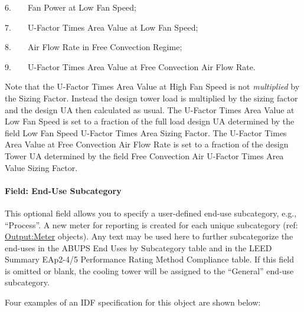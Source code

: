 6.~~~~Fan Power at Low Fan Speed;

7.~~~~U-Factor Times Area Value at Low Fan Speed;

8.~~~~Air Flow Rate in Free Convection Regime;

9.~~~~U-Factor Times Area Value at Free Convection Air Flow Rate.

Note that the U-Factor Times Area Value at High Fan Speed is not \emph{multiplied} by the Sizing Factor. Instead the design tower load is multiplied by the sizing factor and the design UA then calculated as usual. The U-Factor Times Area Value at Low Fan Speed is set to a fraction of the full load design UA determined by the field Low Fan Speed U-Factor Times Area Sizing Factor. The U-Factor Times Area Value at Free Convection Air Flow Rate is set to a fraction of the design Tower UA determined by the field Free Convection Air U-Factor Times Area Value Sizing Factor.

\paragraph{Field: End-Use Subcategory}\label{end-use-subcategory-02}

This optional field allows you to specify a user-defined end-use subcategory, e.g., ``Process''. A new meter for reporting is created for each unique subcategory (ref: \hyperref[outputmeter-and-outputmetermeterfileonly]{Output:Meter} objects). Any text may be used here to further subcategorize the end-uses in the ABUPS End Uses by Subcategory table and in the LEED Summary EAp2-4/5 Performance Rating Method Compliance table. If this field is omitted or blank, the cooling tower will be assigned to the ``General'' end-use subcategory.

Four examples of an IDF specification for this object are shown below:

